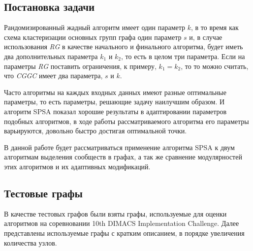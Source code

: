 
\subsection{Постановка задачи}

Рандомизированный жадный алгоритм имеет один параметр $k$, в то время как схема кластеризации основных групп графа один параметр $s$ и, в случае использования \emph{RG} в качестве начального и финального алгоритма, будет иметь два дополнительных параметра $k_1$ и $k_2$, то есть в целом три параметра. Если на параметры \emph{RG} поставить ограничения, к примеру, $k_1 = k_2$, то то можно считать, что \emph{CGGC} имеет два параметра, $s$ и $k$.

Часто алгоритмы на каждых входных данных имеют разные оптимальные параметры, то есть параметры, решающие задачу наилучшим образом. И алгоритм SPSA показал хорошие результаты в адаптировании параметров подобных алгоритмов, в ходе работы рассматриваемого алгоритма его параметры варьируются, довольно быстро достигая оптимальной точки.

В данной работе будет рассматриваться применение алгоритма SPSA к двум алгоритмам выделения сообществ в графах, а так же сравнение модулярностей этих алгоритмов и их адаптивных модификаций.



\subsection{Тестовые графы}

В качестве тестовых графов были взяты графы, используемые для оценки алгоритмов на соревновании 10th DIMACS Implementation Challenge. Далее представлены используемые графы с кратким описанием, в порядке увеличения количества узлов.

